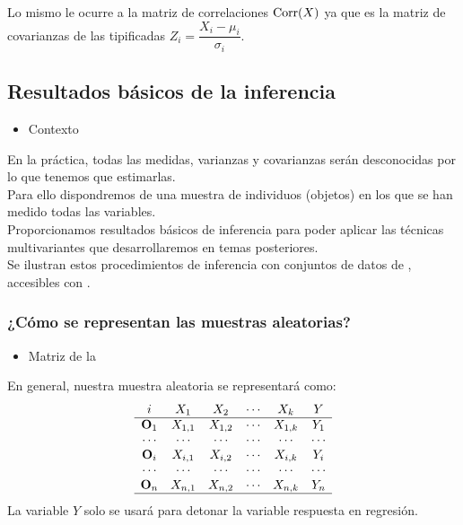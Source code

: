 Lo mismo le ocurre a la matriz de correlaciones $\operatorname{Corr}(X)$ ya que es la matriz de covarianzas de las \vas tipificadas $Z_i=\dfrac{X_i-\mu_i}{\sigma_i}$.
\subsection{Resultados básicos de la inferencia}
\begin{itemize}[label=\color{red}\textbullet, leftmargin=*]
	\item \color{lightblue}Contexto
\end{itemize}
En la práctica, todas las medidas, varianzas y covarianzas serán desconocidas por lo que tenemos que estimarlas.\\
Para ello dispondremos de una muestra de individuos (objetos) en los que se han medido todas las variables.\\
Proporcionamos resultados básicos de inferencia para poder aplicar las técnicas multivariantes que desarrollaremos en temas posteriores.\\
Se ilustran estos procedimientos de inferencia con conjuntos de datos de , accesibles con .
\subsubsection{¿Cómo se representan las muestras aleatorias?}

\begin{figure}
\end{figure}

\begin{itemize}[label=\color{red}\textbullet, leftmargin=*]
	\item \color{lightblue}Matriz de la \mas
\end{itemize}

En general, nuestra muestra aleatoria se representará como:
\[ \begin{array}{cccccc}
i & X_1 & X_2 & \cdots & X_k & Y \\ \hline
\mathbf{O}_1 & X_{1,1} & X_{1,2} & \cdots & X_{1,k} & Y_1 \\
\cdots & \cdots & \cdots & \cdots & \cdots & \cdots \\
\mathbf{O}_i & X_{i,1} & X_{i,2} & \cdots & X_{i,k} & Y_i \\
\cdots & \cdots & \cdots & \cdots & \cdots & \cdots \\
\mathbf{O}_n & X_{n,1} & X_{n,2} & \cdots & X_{n,k} & Y_n \\ \hline
\end{array} \]
La variable $Y$ solo se usará para detonar la variable respuesta en regresión.

